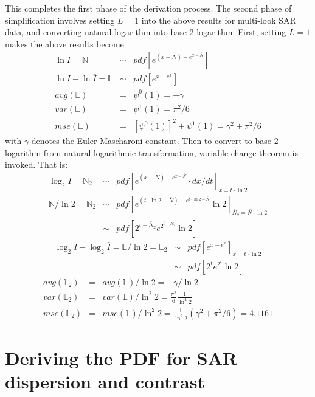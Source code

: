 This completes the first phase of the derivation process.
The second phase of simplification involves setting $L=1$ into the above results for multi-look SAR data,
  and converting natural logarithm into base-2 logarithm.
First, setting $L=1$ makes the above results become
\begin{eqnarray*}
   \ln{I} = \mathbb{N} &\sim&  pdf \left[ e^{(x-\bar{N})-e^{x-\bar{N}}} \right] \\
   \ln{I} - \ln{\bar{I}} = \mathbb{L} &\sim& pdf \left[ e^{x-e^x}  \right] \\ 
    avg(\mathbb{L}) &=& \psi^0(1) = -\gamma \\
    var(\mathbb{L}) &=& \psi^1(1) = \pi^2 / 6 \\  
    mse(\mathbb{L}) &=& \left[ \psi^0(1) \right]^2 + \psi^1(1) = \gamma^2 + \pi^2 / 6
\end{eqnarray*}
with $\gamma$ denotes the Euler-Mascharoni constant.
Then to convert to base-2 logarithm from natural logarithmic transformation,
  variable change theorem is invoked.
  That is:
  \begin{eqnarray*}
   \log_2{I}  = \mathbb{N}_2    &\sim&  pdf \left[ e^{(x-\bar{N})-e^{x-\bar{N}}} \cdot dx/dt \right]_{x=t\cdot \ln{2}} \\
   \mathbb{N} / \ln{2} = \mathbb{N}_2 &\sim&  pdf \left[ e^{(t\cdot \ln{2}-\bar{N})-e^{t\cdot \ln{2}-\bar{N}}} \ln{2} \right]_{\bar{N}_2 = \bar{N} \cdot \ln{2}} \\
       &\sim&  pdf \left[ 2^{t-\bar{N}_2}e^{2^{t-\bar{N}_2}} \ln{2} \right] 
  \end{eqnarray*}
\begin{eqnarray*}
   \log_2{I} - \log_2{\bar{I}} = \mathbb{L} / \ln{2} = \mathbb{L}_2 &\sim& pdf \left[ e^{x-e^x}  \right]_{x=t \cdot \ln{2}} \\  
       &\sim& pdf \left[ 2^t e^{2^t} \ln{2}  \right] 
\end{eqnarray*}
\begin{eqnarray*}
  avg(\mathbb{L}_2) &=& avg(\mathbb{L})/ \ln{2} = -\gamma / \ln{2} \\
  var(\mathbb{L}_2) &=& var(\mathbb{L})/ \ln^2{2} = \frac{\pi^2}{6} \frac{1}{ \ln^2{2}} \\
  mse(\mathbb{L}_2) &=& mse(\mathbb{L})/ \ln^2{2} = \frac{1}{\ln^2{2}}( \gamma^2 + \pi^2/6 ) = 4.1161 
\end{eqnarray*}

\section{Deriving the PDF for SAR dispersion and contrast}

